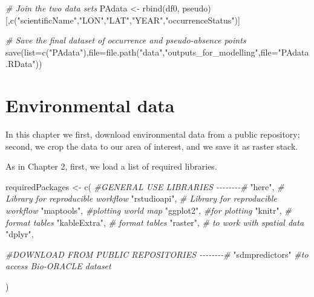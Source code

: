 \documentclass[
]{book}
\newenvironment{Shaded}{\begin{snugshade}}{\end{snugshade}}
\newcommand{\AttributeTok}[1]{\textcolor[rgb]{0.77,0.63,0.00}{#1}}
\newcommand{\CommentTok}[1]{\textcolor[rgb]{0.56,0.35,0.01}{\textit{#1}}}
\newcommand{\FunctionTok}[1]{\textcolor[rgb]{0.00,0.00,0.00}{#1}}
\newcommand{\NormalTok}[1]{#1}
\newcommand{\OtherTok}[1]{\textcolor[rgb]{0.56,0.35,0.01}{#1}}
\newcommand{\StringTok}[1]{\textcolor[rgb]{0.31,0.60,0.02}{#1}}
\begin{document}
\begin{Shaded}
\begin{Highlighting}[]
\CommentTok{\# Join the two data sets }
\NormalTok{PAdata }\OtherTok{\textless{}{-}} \FunctionTok{rbind}\NormalTok{(df0, pseudo)[,}\FunctionTok{c}\NormalTok{(}\StringTok{"scientificName"}\NormalTok{,}\StringTok{"LON"}\NormalTok{,}\StringTok{"LAT"}\NormalTok{,}\StringTok{"YEAR"}\NormalTok{,}\StringTok{"occurrenceStatus"}\NormalTok{)]}

\CommentTok{\# Save the final dataset of occurrence and pseudo{-}absence points}
\FunctionTok{save}\NormalTok{(}\AttributeTok{list=}\FunctionTok{c}\NormalTok{(}\StringTok{"PAdata"}\NormalTok{),}\AttributeTok{file=}\FunctionTok{file.path}\NormalTok{(}\StringTok{"data"}\NormalTok{,}\StringTok{"outputs\_for\_modelling"}\NormalTok{,}\AttributeTok{file=}\StringTok{"PAdata.RData"}\NormalTok{))}
\end{Highlighting}
\end{Shaded}

\hypertarget{environmental-data}{%
\chapter{Environmental data}\label{environmental-data}}

In this chapter we first, download environmental data from a public repository; second, we crop the data to our area of interest, and we save it as raster stack.

As in Chapter 2, first, we load a list of required libraries.

\begin{Shaded}
\begin{Highlighting}[]
\NormalTok{requiredPackages }\OtherTok{\textless{}{-}} \FunctionTok{c}\NormalTok{(}
  \CommentTok{\#GENERAL USE LIBRARIES {-}{-}{-}{-}{-}{-}{-}{-}\#}
  \StringTok{"here"}\NormalTok{, }\CommentTok{\# Library for reproducible workflow}
  \StringTok{"rstudioapi"}\NormalTok{,  }\CommentTok{\# Library for reproducible workflow}
  \StringTok{"maptools"}\NormalTok{, }\CommentTok{\#plotting world map}
  \StringTok{"ggplot2"}\NormalTok{, }\CommentTok{\#for plotting}
  \StringTok{"knitr"}\NormalTok{,  }\CommentTok{\# format tables}
  \StringTok{"kableExtra"}\NormalTok{, }\CommentTok{\# format tables}
  \StringTok{"raster"}\NormalTok{, }\CommentTok{\# to work with spatial data}
  \StringTok{"dplyr"}\NormalTok{,}
  
  \CommentTok{\#DOWNLOAD FROM PUBLIC REPOSITORIES {-}{-}{-}{-}{-}{-}{-}{-}\#}
  \StringTok{"sdmpredictors"} \CommentTok{\#to access Bio{-}ORACLE dataset}
  
\NormalTok{    )}
\end{Highlighting}
\end{Shaded}
\end{document}
